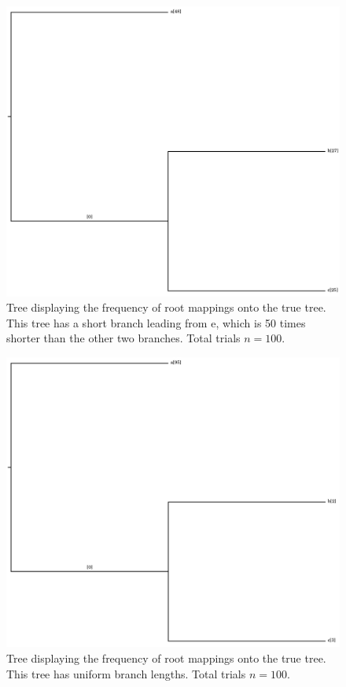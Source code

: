 \documentclass{article}
\begin{document}
\begin{figure}
  \includegraphics[width=.9\linewidth]{figs/reverse_lba1.png}
  \caption{Tree displaying the frequency of root mappings onto the true tree.
  This tree has a short branch leading from e, which is 50 times shorter than
  the other two branches. Total trials $n=100$.}
  \label{fig:reverse_lba_tree}
\end{figure}

\begin{figure}
  \includegraphics[width=.9\linewidth]{figs/lba_control.png}
  \caption{Tree displaying the frequency of root mappings onto the true tree.
  This tree has uniform branch lengths. Total trials $n=100$.}
  \label{fig:reverse_lba_tree}
\end{figure}
\end{document}
